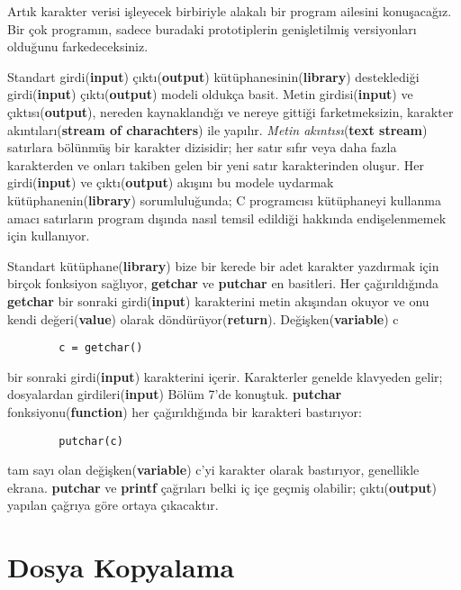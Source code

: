 \documentclass[a4paper,12pt,oneside]{book}
\begin{document}
Artık karakter verisi işleyecek birbiriyle alakalı bir program ailesini konuşacağız. Bir çok programın, sadece buradaki prototiplerin genişletilmiş versiyonları olduğunu farkedeceksiniz.
\par Standart girdi(\textbf{input}) çıktı(\textbf{output}) kütüphanesinin(\textbf{library}) desteklediği girdi(\textbf{input}) çıktı(\textbf{output}) modeli oldukça basit. Metin girdisi(\textbf{input}) ve çıktısı(\textbf{output}), nereden kaynaklandığı ve nereye gittiği farketmeksizin, karakter akıntıları(\textbf{stream of charachters}) ile yapılır. \textit{Metin akıntısı}(\textbf{text stream}) satırlara bölünmüş bir karakter dizisidir; her satır sıfır veya daha fazla karakterden ve onları takiben gelen bir yeni satır karakterinden oluşur. Her girdi(\textbf{input}) ve çıktı(\textbf{output}) akışını bu modele uydarmak kütüphanenin(\textbf{library}) sorumluluğunda; C programcısı kütüphaneyi kullanma amacı satırların program dışında nasıl temsil edildiği hakkında endişelenmemek için kullanıyor.
\par Standart kütüphane(\textbf{library}) bize bir kerede bir adet karakter yazdırmak için birçok fonksiyon sağlıyor, \textbf{getchar} ve \textbf{putchar} en basitleri. Her çağırıldığında \textbf{getchar} bir sonraki girdi(\textbf{input}) karakterini metin akışından okuyor ve onu kendi değeri(\textbf{value}) olarak döndürüyor(\textbf{return}). Değişken(\textbf{variable}) c
\begin{lstlisting}
		c = getchar()
\end{lstlisting}
bir sonraki girdi(\textbf{input}) karakterini içerir. Karakterler genelde klavyeden gelir; dosyalardan girdileri(\textbf{input}) Bölüm 7'de konuştuk.
\textbf{putchar} fonksiyonu(\textbf{function}) her çağırıldığında bir karakteri bastırıyor:
\begin{lstlisting}
		putchar(c)
\end{lstlisting}
tam sayı olan değişken(\textbf{variable}) c'yi karakter olarak bastırıyor, genellikle ekrana. \textbf{putchar} ve \textbf{printf} çağrıları belki iç içe geçmiş olabilir; çıktı(\textbf{output}) yapılan çağrıya göre ortaya çıkacaktır. \pagebreak

\section{Dosya Kopyalama}
\end{document}
